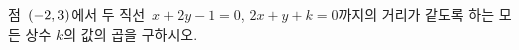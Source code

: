 점~$(-2{,}\mkern3mu\mathopen{}3)$에서 두 직선~$x+2y-1=0$, $2x+y+k=0$까지의 거리가 같도록 하는 모든 상수 $k$의 값의 곱을 구하시오.
